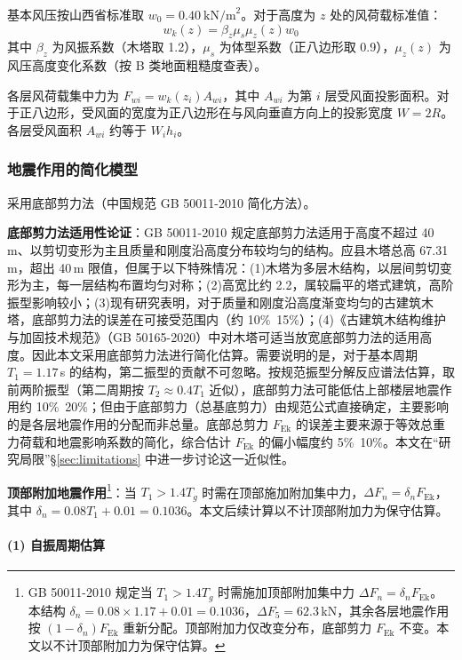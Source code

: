 \documentclass[12pt,a4paper,UTF8]{ctexart}
\begin{document}
基本风压按山西省标准取 $w_0 = 0.40\ \text{kN/m}^2$。对于高度为 $z$ 处的风荷载标准值：
\[
    w_k(z) = \beta_z \mu_s \mu_z(z) w_0
\]
其中 $\beta_z$ 为风振系数（木塔取 1.2），$\mu_s$ 为体型系数（正八边形取 0.9），$\mu_z(z)$ 为风压高度变化系数（按 B 类地面粗糙度查表\cite{gb50009}）。

各层风荷载集中力为 $F_{wi} = w_k(z_i) A_{wi}$，其中 $A_{wi}$ 为第 $i$ 层受风面投影面积。对于正八边形，受风面的宽度为正八边形在与风向垂直方向上的投影宽度 $W = 2R$。各层受风面积 $A_{wi}$ 约等于 $W_i h_i$。

\subsubsection{地震作用的简化模型}

采用底部剪力法（中国规范 GB 50011-2010\cite{gb50011} 简化方法）。

\textbf{底部剪力法适用性论证}：GB 50011-2010 规定底部剪力法适用于高度不超过 40\,m、以剪切变形为主且质量和刚度沿高度分布较均匀的结构。应县木塔总高 67.31\,m，超出 40\,m 限值，但属于以下特殊情况：(1)木塔为多层木结构，以层间剪切变形为主，每一层结构布置均匀对称；(2)高宽比约 2.2，属较扁平的塔式建筑，高阶振型影响较小；(3)现有研究表明\cite{yu2000,zhao2002}，对于质量和刚度沿高度渐变均匀的古建筑木塔，底部剪力法的误差在可接受范围内（约 10\%~15\%）；(4)《古建筑木结构维护与加固技术规范》（GB 50165-2020\cite{gb50165}）中对木塔可适当放宽底部剪力法的适用高度。因此本文采用底部剪力法进行简化估算。需要说明的是，对于基本周期 $T_1 = 1.17$\,s 的结构，第二振型的贡献不可忽略。按规范振型分解反应谱法估算，取前两阶振型（第二周期按 $T_2 \approx 0.4T_1$ 近似），底部剪力法可能低估上部楼层地震作用约 10\%~20\%；但由于底部剪力（总基底剪力）由规范公式直接确定，主要影响的是各层地震作用的分配而非总量。底部总剪力 $F_{\text{Ek}}$ 的误差主要来源于等效总重力荷载和地震影响系数的简化，综合估计 $F_{\text{Ek}}$ 的偏小幅度约 5\%~10\%。本文在“研究局限”§\ref{sec:limitations} 中进一步讨论这一近似性。

\textbf{顶部附加地震作用}\footnote{GB 50011-2010 规定当 $T_1 > 1.4T_g$ 时需施加顶部附加集中力 $\Delta F_n = \delta_n F_{\text{Ek}}$。本结构 $\delta_n = 0.08 \times 1.17 + 0.01 = 0.1036$，$\Delta F_5 = 62.3$\,kN，其余各层地震作用按 $(1-\delta_n)F_{\text{Ek}}$ 重新分配。顶部附加力仅改变分布，底部剪力 $F_{\text{Ek}}$ 不变。本文以不计顶部附加力为保守估算。}：当 $T_1 > 1.4T_g$ 时需在顶部施加附加集中力，$\Delta F_n = \delta_n F_{\text{Ek}}$，其中 $\delta_n = 0.08T_1 + 0.01 = 0.1036$。本文后续计算以不计顶部附加力为保守估算。

\paragraph{(1) 自振周期估算}
\end{document}
